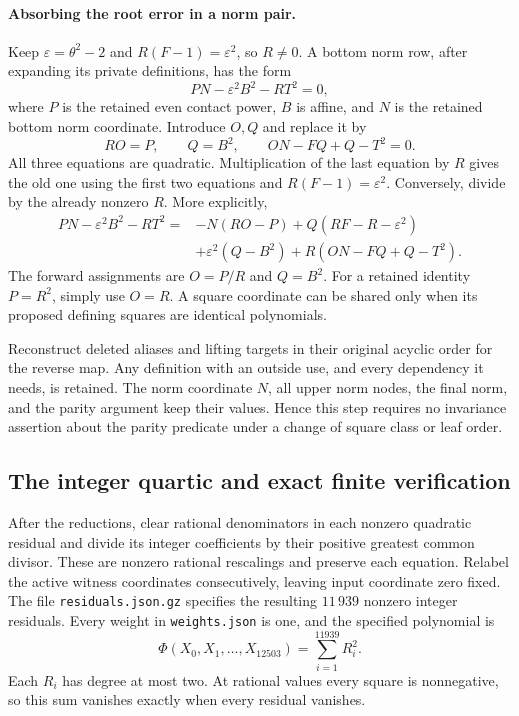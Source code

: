 \documentclass[11pt]{article}
\theoremstyle{definition}
\theoremstyle{remark}
\begin{document}
\paragraph{Absorbing the root error in a norm pair.}
Keep $\varepsilon=\theta^2-2$ and $R(F-1)=\varepsilon^2$, so $R\ne0$.
A bottom norm row, after expanding its private definitions, has the form
\[
 PN-\varepsilon^2B^2-RT^2=0,
\]
where $P$ is the retained even contact power, $B$ is affine, and $N$
is the retained bottom norm coordinate. Introduce $O,Q$ and replace it by
\[
 RO=P,\qquad Q=B^2,\qquad ON-FQ+Q-T^2=0.
\]
All three equations are quadratic. Multiplication of the last equation
by $R$ gives the old one using the first two equations and
$R(F-1)=\varepsilon^2$. Conversely, divide by the already nonzero $R$.
More explicitly,
\begin{align*}
 PN-\varepsilon^2B^2-RT^2
 ={}&-N(RO-P)+Q(RF-R-\varepsilon^2)\\
    &+\varepsilon^2(Q-B^2)+R(ON-FQ+Q-T^2).
\end{align*}
The forward assignments are $O=P/R$ and $Q=B^2$. For a retained
identity $P=R^2$, simply use $O=R$. A square coordinate can be shared
only when its proposed defining squares are identical polynomials.

Reconstruct deleted aliases and lifting targets in their original
acyclic order for the reverse map. Any definition with an outside use,
and every dependency it needs, is retained. The norm coordinate $N$,
all upper norm nodes, the final norm, and the parity argument keep their
values. Hence this step requires no invariance assertion about the
parity predicate under a change of square class or leaf order.

\subsection{The integer quartic and exact finite verification}

After the reductions, clear rational denominators in each nonzero quadratic
residual and divide its integer coefficients by their positive greatest
common divisor. These are nonzero rational rescalings and preserve each
equation. Relabel the active witness coordinates consecutively, leaving
input coordinate zero fixed. The file \nolinkurl{residuals.json.gz}
specifies the resulting $11\,939$ nonzero integer residuals. Every weight
in \nolinkurl{weights.json} is one, and the specified polynomial is
\[
 \Phi(X_0,X_1,\ldots,X_{12503})=\sum_{i=1}^{11939}R_i^2.
\]
Each $R_i$ has degree at most two. At rational values every square is
nonnegative, so this sum vanishes exactly when every residual vanishes.
\end{document}
